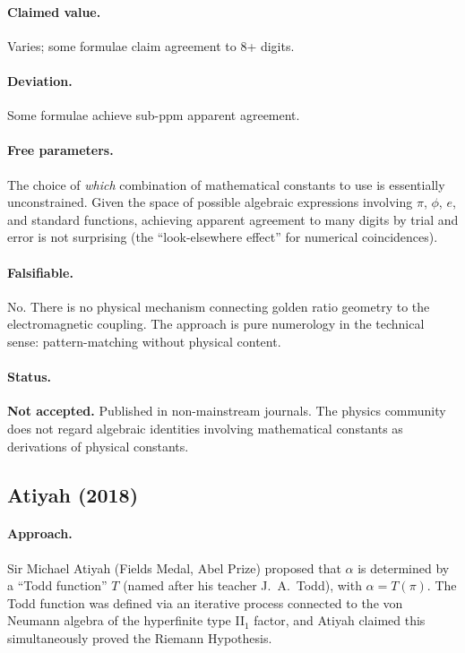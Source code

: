 \documentclass[11pt,a4paper]{article}
\begin{document}
\paragraph{Claimed value.}
Varies; some formulae claim agreement to 8+ digits.

\paragraph{Deviation.}
Some formulae achieve sub-ppm apparent agreement.

\paragraph{Free parameters.}
The choice of \emph{which} combination of mathematical constants to use is essentially unconstrained.  Given the space of possible algebraic expressions involving $\pi$, $\phi$, $e$, and standard functions, achieving apparent agreement to many digits by trial and error is not surprising (the ``look-elsewhere effect'' for numerical coincidences).

\paragraph{Falsifiable.}
No.  There is no physical mechanism connecting golden ratio geometry to the electromagnetic coupling.  The approach is pure numerology in the technical sense: pattern-matching without physical content.

\paragraph{Status.}
\textbf{Not accepted.}  Published in non-mainstream journals.  The physics community does not regard algebraic identities involving mathematical constants as derivations of physical constants.

\subsection{Atiyah (2018)}\label{sec:atiyah}

\paragraph{Approach.}
Sir Michael Atiyah (Fields Medal, Abel Prize) proposed that $\alpha$ is determined by a ``Todd function'' $T$ (named after his teacher J.~A.~Todd), with $\alpha = T(\pi)$.  The Todd function was defined via an iterative process connected to the von Neumann algebra of the hyperfinite type II$_1$ factor, and Atiyah claimed this simultaneously proved the Riemann Hypothesis.
\end{document}
